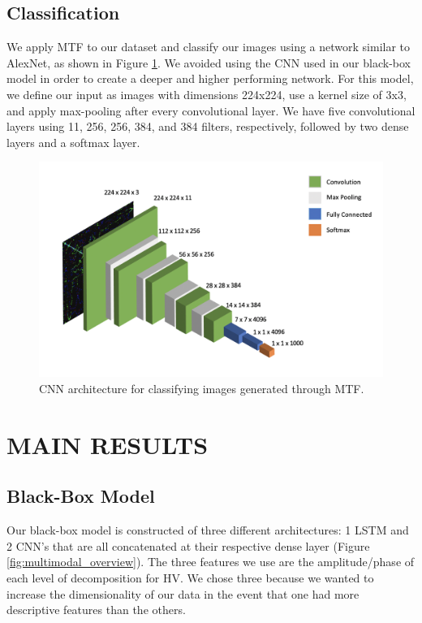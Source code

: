 \documentclass{turabian-thesis}[12pt]
\begin{document}
\section{Classification}
We apply MTF to our dataset and classify our images using a network similar to AlexNet, as shown in Figure \ref{fig:mtf_cnn_model}. We avoided using the CNN used in our black-box model in order to create a deeper and higher performing network. For this model, we define our input as images with dimensions 224x224, use a kernel size of 3x3, and apply max-pooling after every convolutional layer. We have five convolutional layers using 11, 256, 256, 384, and 384 filters, respectively, followed by two dense layers and a softmax layer.
\begin{figure}[h!]
   \begin{center}
      \includegraphics[scale=.7]{../media/2d_cnn.png}
   \end{center}
   \caption{CNN architecture for classifying images generated through MTF.}
   \label{fig:mtf_cnn_model}
\end{figure}



\chapter{MAIN RESULTS}
\label{chap:results}

\section{Black-Box Model}
Our black-box model is constructed of three different architectures: 1 LSTM and 2 CNN’s that are all concatenated at their respective dense layer (Figure \ref{fig:multimodal_overview}). The three features we use are the amplitude/phase of each level of decomposition for HV. We chose three because we wanted to increase the dimensionality of our data in the event that one had more descriptive features than the others. 
\end{document}
